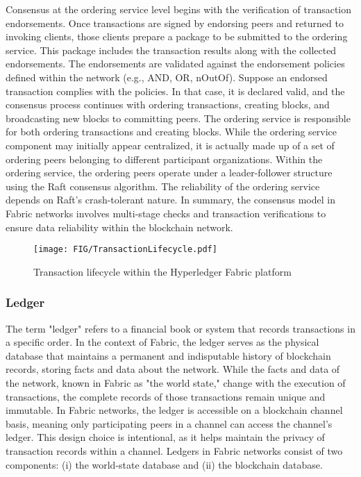 \documentclass[conference]{IEEEtran}
\begin{document}
Consensus at the ordering service level begins with the verification of transaction endorsements. Once transactions are signed by endorsing peers and returned to invoking clients, those clients prepare a package to be submitted to the ordering service. This package includes the transaction results along with the collected endorsements. The endorsements are validated against the endorsement policies defined within the network (e.g., AND, OR, nOutOf). Suppose an endorsed transaction complies with the policies. In that case, it is declared valid, and the consensus process continues with ordering transactions, creating blocks, and broadcasting new blocks to committing peers. The ordering service is responsible for both ordering transactions and creating blocks. While the ordering service component may initially appear centralized, it is actually made up of a set of ordering peers belonging to different participant organizations. Within the ordering service, the ordering peers operate under a leader-follower structure using the Raft consensus algorithm. The reliability of the ordering service depends on Raft's crash-tolerant nature. In summary, the consensus model in Fabric networks involves multi-stage checks and transaction verifications to ensure data reliability within the blockchain network.\\
%
\begin{figure*}
    \centering
    \texttt{[image: FIG/TransactionLifecycle.pdf]}
    \caption{Transaction lifecycle within the Hyperledger Fabric platform}
    \label{fig:transactionLifecycle}
\end{figure*}
%
\subsubsection{Ledger}
The term "ledger" refers to a financial book or system that records transactions in a specific order. In the context of Fabric, the ledger serves as the physical database that maintains a permanent and indisputable history of blockchain records, storing facts and data about the network. While the facts and data of the network, known in Fabric as "the world state," change with the execution of transactions, the complete records of those transactions remain unique and immutable. In Fabric networks, the ledger is accessible on a blockchain channel basis, meaning only participating peers in a channel can access the channel's ledger. This design choice is intentional, as it helps maintain the privacy of transaction records within a channel. Ledgers in Fabric networks consist of two components: (i) the world-state database and (ii) the blockchain database. \\
\end{document}
